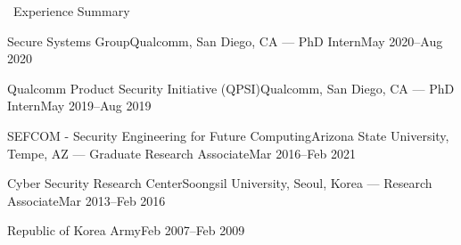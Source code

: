 \documentclass{resume} %
\begin{document}

\begin{rSection}{\faGenderless~Experience Summary}

    \begin{rSubsection2}
        {Secure Systems Group}{Qualcomm, San Diego, CA}
        {--- PhD Intern}{May 2020--Aug 2020}
    \end{rSubsection2}
    \vspace{-3mm}

    \begin{rSubsection2}
        {Qualcomm Product Security Initiative (QPSI)}{Qualcomm, San Diego, CA}
        {--- PhD Intern}{May 2019--Aug 2019}
    \end{rSubsection2}
    \vspace{-3mm}

    \begin{rSubsection2}
		{SEFCOM - {\small Security Engineering for Future Computing}}{Arizona State University, Tempe, AZ}
		{--- Graduate Research Associate}{Mar 2016--Feb 2021}
	\end{rSubsection2}
    \vspace{-3mm}

	\begin{rSubsection2}
		{Cyber Security Research Center}{Soongsil University, Seoul, Korea}
		{--- Research Associate}{Mar 2013--Feb 2016}
	\end{rSubsection2}
	\vspace{-3mm}

	\begin{rSubsection2}
		{Republic of Korea Army}{Feb 2007--Feb 2009}
		{}{}
	\end{rSubsection2}

\vspace{3mm}
\end{rSection}
\end{document}
